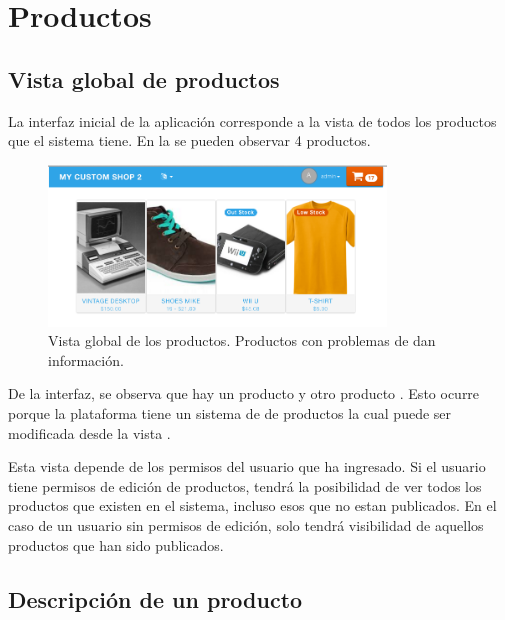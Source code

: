 
\section{Productos}

	\subsection{Vista global de productos}\label{chapter:section:productos:subsection:vista_global}
		La interfaz inicial de la aplicación corresponde a la vista de todos los productos que el sistema tiene. En la  se pueden observar 4 productos.

		\begin{figure}[H]
			\centering
			\includegraphics[width=0.8\textwidth]{figuras/productos/grid/global_view_toolbar.png}

			\caption{Vista global de los productos. Productos con problemas de \stock dan información.}
			\label{figure:solution:product:global_view:view}
		\end{figure}

		De la interfaz, se observa que hay un producto \soldoutEF y otro producto \limitedStockEF. Esto ocurre porque la plataforma tiene un sistema de \trackingCPT de productos la cual puede ser modificada desde la vista .


		Esta vista depende de los permisos del usuario que ha ingresado. Si el usuario tiene permisos de edición de productos, tendrá la posibilidad de ver todos los productos que existen en el sistema, incluso esos que no estan publicados. En el caso de un usuario sin permisos de edición, solo tendrá visibilidad de aquellos productos que han sido publicados.

	\subsection{Descripción de un producto}\label{chapter:section:productos:subsection:descripcion}

